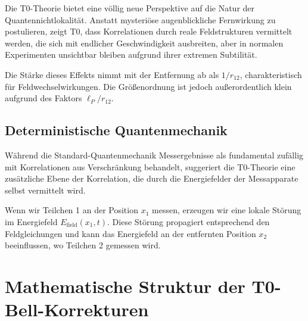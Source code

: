 \documentclass[12pt,a4paper]{article}
\begin{document}
		Die T0-Theorie bietet eine v\"ollig neue Perspektive auf die Natur der Quantennichtlokalit\"at. Anstatt mysteri\"ose augenblickliche Fernwirkung zu postulieren, zeigt T0, dass Korrelationen durch reale Feldstrukturen vermittelt werden, die sich mit endlicher Geschwindigkeit ausbreiten, aber in normalen Experimenten unsichtbar bleiben aufgrund ihrer extremen Subtilität.
		
		Die St\"arke dieses Effekts nimmt mit der Entfernung ab als $1/r_{12}$, charakteristisch f\"ur Feldwechselwirkungen. Die Gr\"o\ss{}enordnung ist jedoch au\ss{}erordentlich klein aufgrund des Faktors $\ell_P/r_{12}$.
		
		\subsection{Deterministische Quantenmechanik}
		
		W\"ahrend die Standard-Quantenmechanik Messergebnisse als fundamental zuf\"allig mit Korrelationen aus Verschr\"ankung behandelt, suggeriert die T0-Theorie eine zus\"atzliche Ebene der Korrelation, die durch die Energiefelder der Messapparate selbst vermittelt wird.
		
		Wenn wir Teilchen 1 an der Position $x_1$ messen, erzeugen wir eine lokale St\"orung im Energiefeld $E_{\text{field}}(x_1, t)$. Diese St\"orung propagiert entsprechend den Feldgleichungen und kann das Energiefeld an der entfernten Position $x_2$ beeinflussen, wo Teilchen 2 gemessen wird.
	
	
	\section{Mathematische Struktur der T0-Bell-Korrekturen}
	
\end{document}
